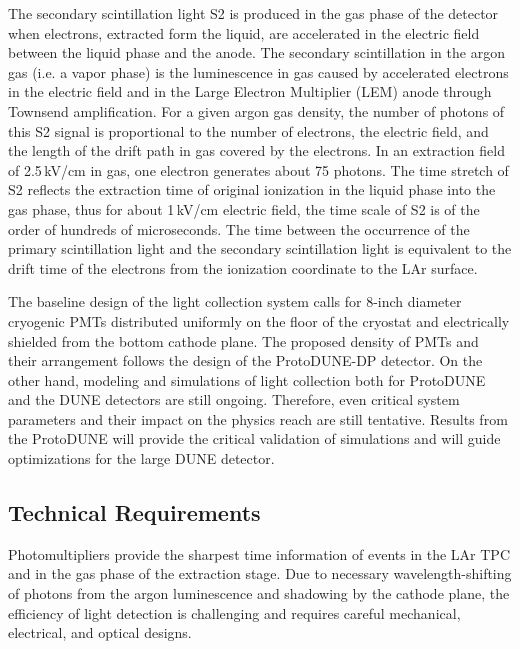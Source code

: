 The secondary scintillation light S2 is produced in the gas phase of the detector when electrons, extracted form the liquid, are accelerated in the electric field between the liquid phase and the anode. The secondary scintillation in the argon gas (i.e. a vapor phase) is the luminescence in gas caused by accelerated electrons in the electric field and in the Large Electron Multiplier (LEM) anode through Townsend amplification. For a given argon gas density, the number of photons of this S2 signal is proportional to the number of electrons, the electric field, and the length of the drift path in gas covered by the electrons. In an extraction field of 2.5\,kV/cm in gas, one electron generates about 75 photons. The time stretch of S2 reflects the extraction time of original ionization in the liquid phase into the gas phase, thus for about 1\,kV/cm electric field, the time scale of S2 is of the order of hundreds of microseconds. The time between the occurrence of the primary scintillation light and the secondary scintillation light is equivalent to the drift time of the electrons from the ionization coordinate to the LAr surface.

The baseline design of the light collection system calls for 8-inch diameter cryogenic PMTs distributed uniformly on the floor of the cryostat and electrically shielded from the bottom cathode plane. The proposed density of PMTs and their arrangement follows the design of the ProtoDUNE-DP detector. On the other hand, modeling and simulations of light collection both for ProtoDUNE and the DUNE detectors are still ongoing. Therefore, even critical system parameters and their impact on the physics reach are still tentative. Results from the ProtoDUNE will provide the critical validation of simulations and will guide optimizations for the large DUNE detector.

\subsection{Technical Requirements}
\label{sec:fddp-pd-1.3}

Photomultipliers provide the sharpest time information of events in the LAr TPC and in the gas phase of the extraction stage. Due to necessary wavelength-shifting of photons from the argon luminescence and shadowing by the cathode plane, the efficiency of light detection is challenging and requires careful mechanical, electrical, and optical designs.

